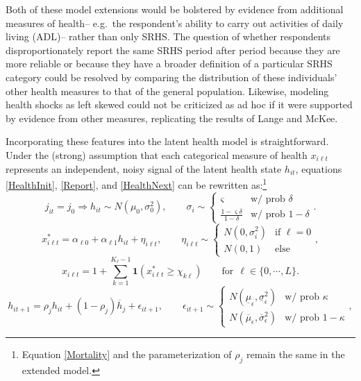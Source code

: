 \documentclass[12pt,pdftex,letterpaper]{article}
\newcommand{\Health}{h}
\newcommand{\ExpHealth}{\overline{\Health}}
\newcommand{\Report}{x}
\newcommand{\Age}{j}
\newcommand{\Corr}{\rho}
\newcommand{\HealthInitMean}{\mu_0}
\newcommand{\HealthInitStd}{\sigma_0}
\newcommand{\Cut}{\chi}
\newcommand{\LatentParam}{\alpha}
\newcommand{\HealthShock}{\epsilon}
\newcommand{\ReportShock}{\eta}
\begin{document}
Both of these model extensions would be bolstered by evidence from additional measures of health-- e.g.\ the respondent's ability to carry out activities of daily living (ADL)-- rather than only SRHS.  The question of whether respondents disproportionately report the same SRHS period after period because they are more reliable or because they have a broader definition of a particular SRHS category could be resolved by comparing the distribution of these individuals' other health measures to that of the general population.  Likewise, modeling health shocks as left skewed could not be criticized as ad hoc if it were supported by evidence from other measures, replicating the results of Lange and McKee.

Incorporating these features into the latent health model is straightforward.  Under the (strong) assumption that each categorical measure of health $\Report_{i \ell t}$ represents an independent, noisy signal of the latent health state $\Health_{it}$, equations \eqref{HealthInit}, \eqref{Report}, and \eqref{HealthNext} can be rewritten as:\footnote{Equation \eqref{Mortality} and the parameterization of $\Corr_{\Age}$ remain the same in the extended model.}
\begin{equation}\label{HealthInitAlt}
\Age_{it}=\Age_0 \Longrightarrow \Health_{it} \sim N(\HealthInitMean, \HealthInitStd^2), \qquad \sigma_{i} \sim
 \begin{cases}
 \varsigma & \text{w/ prob } \delta \\
 \frac{1 - \varsigma \delta}{1-\delta} & \text{w/ prob } 1-\delta
 \end{cases}.
\end{equation}
\begin{equation}\label{ReportAlt}
\Report^*_{i\ell t} = \LatentParam_{\ell 0} + \LatentParam_{\ell 1} \Health_{it} + \ReportShock_{i\ell t}, \qquad \ReportShock_{i\ell t} \sim
\begin{cases}
N(0,\sigma^2_i) & \text{if } \ell=0 \\
N(0,1) & \text{else}
\end{cases},
\end{equation}
\begin{equation*}\Report_{i\ell t} = 1 + \sum_{k = 1}^{K_\ell-1} \mathbf{1}(\Report^*_{i\ell t} \geq \Cut_{k \ell})  \qquad \text{for}~~ \ell \in \{0,\cdots,L\}. 
\end{equation*}
\begin{equation}\label{HealthNextAlt}
\Health_{it+1} = \Corr_{j} \Health_{it} + (1-\Corr_j) \ExpHealth_\Age + \HealthShock_{it+1}, \qquad \HealthShock_{it+1} \sim 
\begin{cases}
N(\underline{\mu}_\HealthShock, \underline{\sigma}_\HealthShock^2) & \text{w/ prob } \kappa \\
N(\overline{\mu}_\HealthShock, \overline{\sigma}_\HealthShock^2) & \text{w/ prob } 1-\kappa
\end{cases},
\end{equation}
\end{document}

